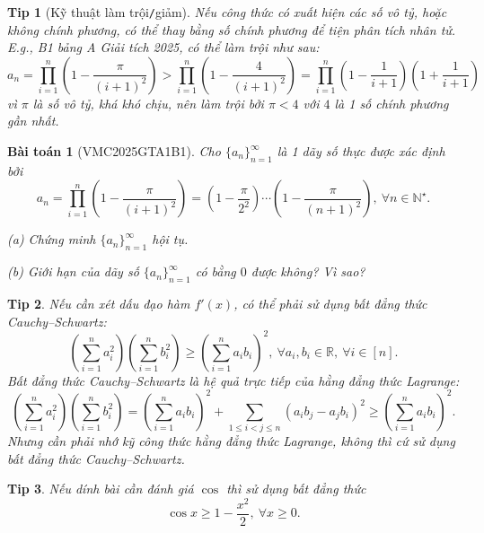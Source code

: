 \documentclass{article}
\newtheorem{baitoan}{Bài toán}
\newtheorem{tip}{Tip}
\begin{document}
\begin{tip}[Kỹ thuật làm trội{\tt/}giảm]
	Nếu công thức có xuất hiện các số vô tỷ, hoặc không chính phương, có thể thay bằng số chính phương để tiện phân tích nhân tử. E.g., B1 bảng A Giải tích 2025, có thể làm trội như sau:
	\begin{equation*}
		a_n = \prod_{i=1}^n \left(1 - \frac{\pi}{(i + 1)^2}\right) > \prod_{i=1}^n \left(1 - \frac{4}{(i + 1)^2}\right) = \prod_{i=1}^n \left(1 - \frac{1}{i + 1}\right)\left(1 + \frac{1}{i + 1}\right)
	\end{equation*}
	vì $\pi$ là số vô tỷ, khá khó chịu, nên làm trội bởi $\pi < 4$ với $4$ là 1 số chính phương gần nhất.
\end{tip}

\begin{baitoan}[VMC2025GTA1B1]
	Cho $\{a_n\}_{n=1}^\infty$ là 1 dãy số thực được xác định bởi
	\begin{equation*}
		a_n = \prod_{i=1}^n \left(1 - \frac{\pi}{(i + 1)^2}\right) = \left(1 - \frac{\pi}{2^2}\right)\cdots\left(1 - \frac{\pi}{(n + 1)^2}\right),\ \forall n\in\mathbb{N}^\star.
	\end{equation*}
	\item(a) Chứng minh $\{a_n\}_{n=1}^\infty$ hội tụ.
	\item(b) Giới hạn của dãy số $\{a_n\}_{n=1}^\infty$ có bằng $0$ được không? Vì sao?
\end{baitoan}

\begin{tip}
	Nếu cần xét dấu đạo hàm $f'(x)$, có thể phải sử dụng bất đẳng thức Cauchy--Schwartz:
	\begin{equation*}
		\left(\sum_{i=1}^n a_i^2\right)\left(\sum_{i=1}^n b_i^2\right)\ge\left(\sum_{i=1}^n a_ib_i\right)^2,\ \forall a_i,b_i\in\mathbb{R},\ \forall i\in[n].
	\end{equation*}
	Bất đẳng thức Cauchy--Schwartz là hệ quả trực tiếp của hằng đẳng thức Lagrange:
	\begin{equation*}
		\left(\sum_{i=1}^n a_i^2\right)\left(\sum_{i=1}^n b_i^2\right) = \left(\sum_{i=1}^n a_ib_i\right)^2 + \sum_{1\le i < j\le n} (a_ib_j - a_jb_i)^2\ge\left(\sum_{i=1}^n a_ib_i\right)^2.
	\end{equation*}
	Nhưng cần phải nhớ kỹ công thức hằng đẳng thức Lagrange, không thì cứ sử dụng bất đẳng thức Cauchy--Schwartz.
\end{tip}

\begin{tip}
	Nếu dính bài cần đánh giá $\cos$ thì sử dụng bất đẳng thức
	\begin{equation*}
		\cos x\ge1 - \frac{x^2}{2},\ \forall x\ge0.
	\end{equation*}
\end{tip}
\end{document}
